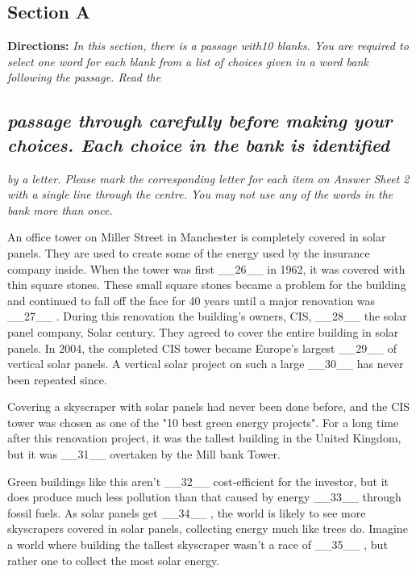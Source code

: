 \documentclass[UTF8,11pt]{ctexart}
\begin{document}
\subsection*{\textbf{Section A}}


\textbf{Directions:}\textit{ In this section, there is a passage with10 blanks. You are required to select one word} \textit{for each blank from a list of choices given in a word bank following the passage. Read the}


\subsection*{\textit{passage through carefully before making your choices. Each choice in the bank is identified}}


\textit{by a letter. Please mark the corresponding letter for each item on Answer Sheet 2 with a} \textit{single line through the centre. You may not use any of the words in the bank more than once.}


An office tower on Miller Street in Manchester is completely covered in solar panels. They are used to create some of the energy used by the insurance company inside. When the tower was first \_\_26\_\_ in 1962, it was covered with thin square stones. These small square stones became a problem for the building and continued to fall off the face for 40 years until a major renovation was \_\_27\_\_ . During this renovation the building's owners, CIS, \_\_28\_\_ the solar panel company, Solar century. They agreed to cover the entire building in solar panels. In 2004, the completed CIS tower became Europe's largest \_\_29\_\_ of vertical solar panels. A vertical solar project on such a large \_\_30\_\_ has never been repeated since.


Covering a skyscraper with solar panels had never been done before, and the CIS tower was chosen as one of the "10 best green energy projects". For a long time after this renovation project, it was the tallest building in the United Kingdom, but it was \_\_31\_\_ overtaken by the Mill bank Tower.


Green buildings like this aren't \_\_32\_\_ cost-efficient for the investor, but it does produce much less pollution than that caused by energy \_\_33\_\_ through fossil fuels. As solar panels get \_\_34\_\_ , the world is likely to see more skyscrapers covered in solar panels, collecting energy much like trees do. Imagine a world where building the tallest skyscraper wasn't a race of \_\_35\_\_ , but rather one to collect the most solar energy.
\end{document}

